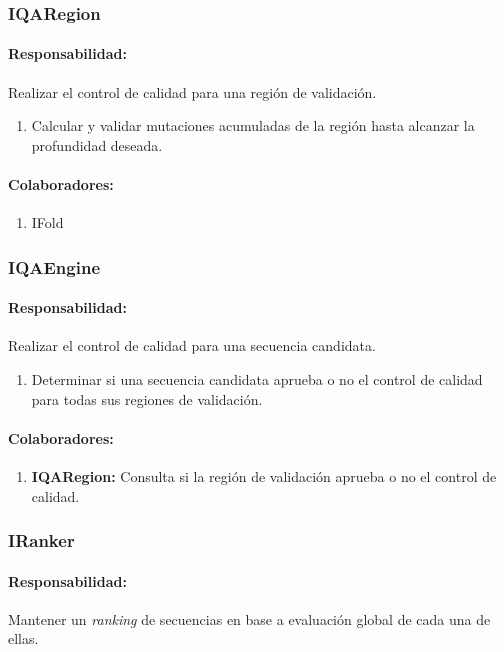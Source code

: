   \subsubsection{IQARegion}
    \paragraph{Responsabilidad:} Realizar el control de calidad para una
regi\'on de validaci\'on.
      \begin{enumerate}
       \item Calcular y validar mutaciones acumuladas de la regi\'on hasta
alcanzar la profundidad deseada.
      \end{enumerate}
    \paragraph{Colaboradores:}
      \begin{enumerate}
       \item IFold
      \end{enumerate}

  \subsubsection{IQAEngine}
    \paragraph{Responsabilidad:} Realizar el control de calidad para una
secuencia candidata.
      \begin{enumerate}             
       \item Determinar si una secuencia candidata aprueba o no el control de
calidad para todas sus regiones de validaci\'on.
      \end{enumerate}
    \paragraph{Colaboradores:}
      \begin{enumerate}
       \item \textbf{IQARegion:} Consulta si la regi\'on de validaci\'on aprueba
o no el control de calidad.
      \end{enumerate}

  \subsubsection{IRanker}
    \paragraph{Responsabilidad:} Mantener un \textit{ranking} de secuencias en
base a evaluaci\'on global de cada una de ellas.   

